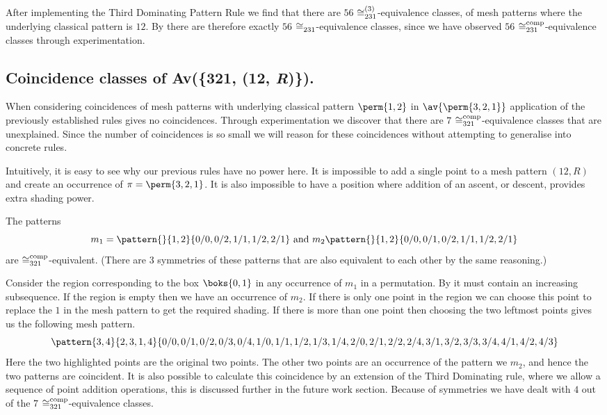 After implementing the Third Dominating Pattern Rule we find that there are
\(56\) \(\coinc[(3)]{231}\)-equivalence classes, of mesh patterns where the
underlying classical pattern is \(12\). By  there are
therefore exactly \(56\) \(\coinc{231}\)-equivalence classes, since we have
observed \(56\) \(\coinc[comp]{231}\)-equivalence classes through
experimentation.

\subsection{Coincidence classes of Av(\{321, (12, \textit{R})\}).}
When considering coincidences of mesh patterns with underlying classical pattern
\(\perm{1,2}\) in \(\av{\perm{3,2,1}}\) application of the previously
established rules gives no coincidences. Through experimentation we discover
that there are \(7\) \(\coinc[comp]{321}\)-equivalence classes that are
unexplained. Since the number of coincidences is so small we will reason for
these coincidences without attempting to generalise into concrete rules.

Intuitively, it is easy to see why our previous rules have no power here. It is
impossible to add a single point to a mesh pattern \((12, R)\) and create an
occurrence of \(\pi = \perm{3,2,1}\). It is also impossible to have a position
where addition of an ascent, or descent, provides extra shading power.

The patterns
\begin{equation*}
    m_1 = \pattern{}{1,2}{0/0, 0/2, 1/1, 1/2, 2/1} \et m_2 \pattern{}{1,2}{0/0,
    0/1, 0/2, 1/1, 1/2, 2/1}
\end{equation*}
are \(\coinc[comp]{321}\)-equivalent. (There are 3 symmetries of these
patterns that are also equivalent to each other by the same reasoning.)

Consider the region corresponding to the box \(\boks{0,1}\) in any occurrence of
\(m_1\) in a permutation. By  it must contain an increasing
subsequence. If the region is empty then we have an occurrence of \(m_2\). If
there is only one point in the region we can choose this point to replace the
\(1\) in the mesh pattern to get the required shading. If there is more than one
point then choosing the two leftmost points gives us the following mesh pattern.
\begin{equation*}
    \pattern{3,4}{2,3,1,4}{0/0, 0/1, 0/2, 0/3, 0/4,
                            1/0, 1/1, 1/2, 1/3, 1/4,
                            2/0, 2/1,2/2, 2/4,
                            3/1, 3/2, 3/3, 3/4,
                            4/1, 4/2, 4/3}
\end{equation*}
Here the two highlighted points are the original two points. The other two
points are an occurrence of the pattern we \(m_2\), and hence the two patterns
are coincident. It is also possible to calculate this coincidence by an
extension of the Third Dominating rule, where we allow a sequence of point
addition operations, this is discussed further in the future work section.
Because of symmetries we have dealt with \(4\) out of the \(7\)
\(\coinc[comp]{321}\)-equivalence classes.

